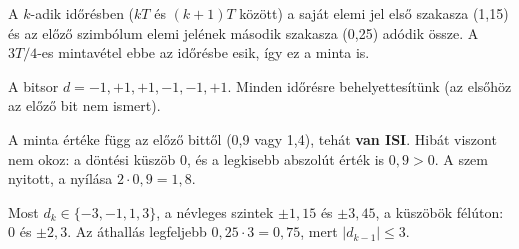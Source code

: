 A $k$-adik időrésben ($kT$ és $(k+1)T$ között) a saját elemi jel első szakasza (1,15) és az előző szimbólum elemi jelének második szakasza (0,25) adódik össze. A $3T/4$-es mintavétel ebbe az időrésbe esik, így ez a minta is.

\begin{center}\end{center}

A bitsor $d=-1,+1,+1,-1,-1,+1$. Minden időrésre behelyettesítünk (az elsőhöz az előző bit nem ismert).

\begin{center}\end{center}

\begin{center}\end{center}

\begin{center}\end{center}

A minta értéke függ az előző bittől (0,9 vagy 1,4), tehát \textbf{van ISI}. Hibát viszont nem okoz: a döntési küszöb 0, és a legkisebb abszolút érték is $0{,}9>0$. A szem nyitott, a nyílása $2\cdot0{,}9=1{,}8$.

Most $d_k\in\{-3,-1,1,3\}$, a névleges szintek $\pm1{,}15$ és $\pm3{,}45$, a küszöbök félúton: $0$ és $\pm2{,}3$. Az áthallás legfeljebb $0{,}25\cdot3=0{,}75$, mert $|d_{k-1}|\le3$.

\begin{center}\end{center}

\begin{center}\end{center}

